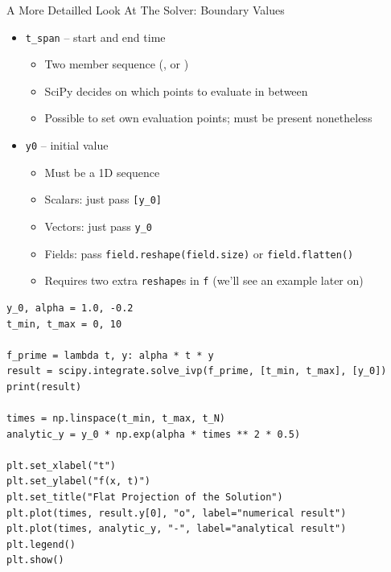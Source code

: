 \begin{frame}[fragile]{A More Detailled Look At The Solver: Boundary Values}
%
\begin{itemize}
\item \texttt{t\_span} -- start and end time
	\begin{itemize}
	\item Two member sequence (\zB {},  or )
	\item SciPy decides on which points to evaluate in between
	\item Possible to set own evaluation points; must be present nonetheless
	\end{itemize}
\item \texttt{y0} -- initial value
	\begin{itemize}
	\item Must be a 1D sequence
	\item Scalars: just pass \texttt{[y\_0]}
	\item Vectors: just pass \texttt{y\_0}
	\item Fields: pass \texttt{field.reshape(field.size)} or \texttt{field.flatten()}
	\item Requires two extra \texttt{reshape}s in \texttt{f} (we'll see an example later on)
	\end{itemize}
\end{itemize}
%
\end{frame}


\begin{frame}[fragile]
%
\begin{codebox}[First Order ODE: $y' {=} \alpha \cdot t \cdot y$]
\begin{verbatim}
y_0, alpha = 1.0, -0.2
t_min, t_max = 0, 10

f_prime = lambda t, y: alpha * t * y
result = scipy.integrate.solve_ivp(f_prime, [t_min, t_max], [y_0])
print(result)

times = np.linspace(t_min, t_max, t_N)
analytic_y = y_0 * np.exp(alpha * times ** 2 * 0.5)

plt.set_xlabel("t")
plt.set_ylabel("f(x, t)")
plt.set_title("Flat Projection of the Solution")
plt.plot(times, result.y[0], "o", label="numerical result")
plt.plot(times, analytic_y, "-", label="analytical result")
plt.legend()
plt.show()
\end{verbatim}
\end{codebox}
%
\end{frame}

